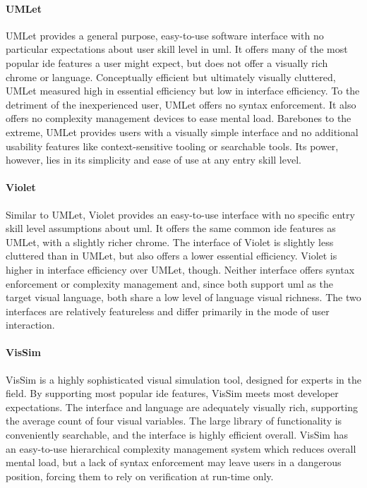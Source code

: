 \paragraph{UMLet} UMLet provides a general purpose, easy-to-use software
interface with no particular expectations about user skill level in \ac{uml}. It offers
many of the most popular \ac{ide} features a user might expect, but does
not offer a visually rich chrome or language. Conceptually efficient but
ultimately visually cluttered, UMLet measured high in essential efficiency but
low in interface efficiency. To the detriment of the inexperienced user,
UMLet offers no syntax enforcement. It also offers no complexity management
devices to ease mental load. Barebones to the extreme, UMLet provides users
with a visually simple interface and no additional usability features like
context-sensitive tooling or searchable tools. Its power, however, lies in
its simplicity and ease of use at any entry skill level.

\paragraph{Violet} Similar to UMLet, Violet provides an easy-to-use
interface with no specific entry skill level assumptions about \ac{uml}. It offers the
same common \ac{ide} features as UMLet, with a slightly richer chrome.
The interface of Violet is slightly less cluttered than in UMLet, but also offers
a lower essential efficiency. Violet is higher in interface efficiency over
UMLet, though. Neither interface offers syntax enforcement or complexity
management and, since both support \ac{uml} as the target visual language,
both share a low level of language visual richness. The two interfaces are
relatively featureless and differ primarily in the mode of user
interaction.

\paragraph{VisSim} VisSim is a highly sophisticated visual simulation tool,
designed for experts in the field. By supporting most popular \ac{ide}
features, VisSim meets most developer expectations. The interface and
language are adequately visually rich, supporting the average count of four
visual variables. The large library of functionality is conveniently
searchable, and the interface is highly efficient overall. VisSim has an easy-to-use
hierarchical complexity management system which reduces overall mental
load, but a lack of syntax enforcement may leave users in a dangerous
position, forcing them to rely on verification at run-time only.

